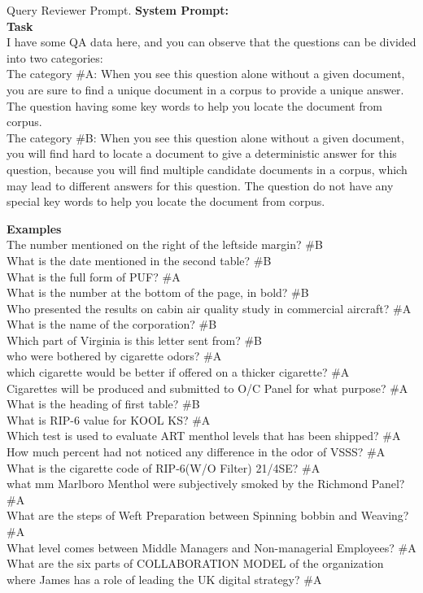 \begin{figure*}[!ht] 
\begin{AIbox}{Query Reviewer Prompt.}
{\color{black}\bf \large System Prompt:} 
\vspace{1mm}
\\
\textbf{Task}  \\
I have some QA data here, and you can observe that the questions can be divided into two categories:\\
The category \#A: When you see this question alone without a given document, you are sure to find a unique document in a corpus to provide a unique answer. The question having some key words to help you locate the document from corpus.\\
The category \#B: When you see this question alone without a given document, you will find hard to locate a document to give a deterministic answer for this question, because you will find multiple candidate documents in a corpus, which may lead to different answers for this question. The question do not have any special key words to help you locate the document from corpus.

\textbf{Examples}\\
The number mentioned on the right of the leftside margin? \#B\\
What is the date mentioned in the second table? \#B\\
What is the full form of PUF? \#A\\
What is the number at the bottom of the page, in bold? \#B\\
Who presented the results on cabin air quality study in commercial aircraft? \#A\\
What is the name of the corporation? \#B\\
Which part of Virginia is this letter sent from? \#B\\
who were bothered by cigarette odors? \#A\\
which cigarette would be better if offered on a thicker cigarette? \#A\\
Cigarettes will be produced and submitted to O/C Panel for what purpose? \#A\\
What is the heading of first table? \#B\\
What is RIP-6 value for KOOL KS? \#A\\
Which test is used to evaluate ART menthol levels that has been shipped? \#A\\
How much percent had not noticed any difference in the odor of VSSS? \#A\\
What is the cigarette code of RIP-6(W/O Filter) 21/4SE? \#A\\
what mm Marlboro Menthol were subjectively smoked by the Richmond Panel? \#A\\
What are the steps of Weft Preparation between Spinning bobbin and Weaving? \#A\\
What level comes between Middle Managers and Non-managerial Employees? \#A\\
What are the six parts of COLLABORATION MODEL of the organization where James has a role of leading the UK digital strategy? \#A


\end{AIbox}
\end{figure*}
